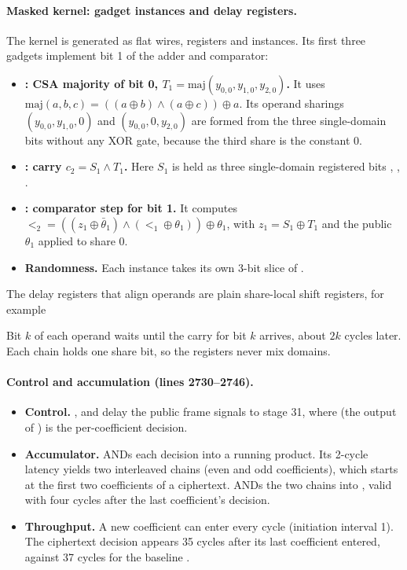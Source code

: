 \paragraph{Masked kernel: gadget instances and delay registers.}
The kernel is generated as flat wires, registers and  instances. Its first three gadgets implement bit 1 of the adder and comparator:

\begin{itemize}
  \item \textbf{: CSA majority of bit 0, $T_1 = \mathrm{maj}(y_{0,0}, y_{1,0}, y_{2,0})$.} It uses $\mathrm{maj}(a, b, c) = ((a \oplus b) \wedge (a \oplus c)) \oplus a$. Its operand sharings $(y_{0,0}, y_{1,0}, 0)$ and $(y_{0,0}, 0, y_{2,0})$ are formed from the three single-domain bits without any XOR gate, because the third share is the constant 0.
  \item \textbf{: carry $c_2 = S_1 \wedge T_1$.} Here $S_1$ is held as three single-domain registered bits , , .
  \item \textbf{: comparator step for bit 1.} It computes $\lt_2 = ((z_1 \oplus \bar\theta_1) \wedge (\lt_1 \oplus \theta_1)) \oplus \theta_1$, with $z_1 = S_1 \oplus T_1$ and the public $\theta_1$ applied to share 0.
  \item \textbf{Randomness.} Each instance takes its own 3-bit slice of .
\end{itemize}

The delay registers that align operands are plain share-local shift registers, for example

Bit $k$ of each operand waits until the carry for bit $k$ arrives, about $2k$ cycles later. Each chain holds one share bit, so the registers never mix domains.

\paragraph{Control and accumulation (lines 2730--2746).}\leavevmode\par

\begin{itemize}
  \item \textbf{Control.} ,  and  delay the public frame signals to stage 31, where  (the output of ) is the per-coefficient decision.
  \item \textbf{Accumulator.}  ANDs each decision into a running product. Its 2-cycle latency yields two interleaved chains (even and odd coefficients), which  starts at the first two coefficients of a ciphertext.  ANDs the two chains into , valid with  four cycles after the last coefficient's decision.
  \item \textbf{Throughput.} A new coefficient can enter every cycle (initiation interval 1). The ciphertext decision appears 35 cycles after its last coefficient entered, against 37 cycles for the baseline .
\end{itemize}


